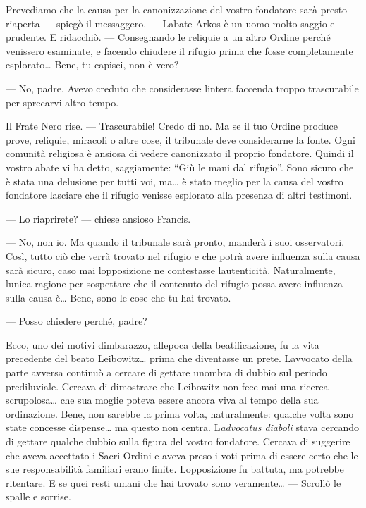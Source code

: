 Prevediamo che la causa per la canonizzazione del vostro fondatore sarà
presto riaperta --- spiegò il messaggero. --- L\textquotesingle abate
Arkos è un uomo molto saggio e prudente. E ridacchiò. --- Consegnando le
reliquie a un altro Ordine perché venissero esaminate, e facendo
chiudere il rifugio prima che fosse completamente esplorato\ldots{}
Bene, tu capisci, non è vero?

--- No, padre. Avevo creduto che considerasse l\textquotesingle intera
faccenda troppo trascurabile per sprecarvi altro tempo.

Il Frate Nero rise. --- Trascurabile! Credo di no. Ma se il tuo Ordine
produce prove, reliquie, miracoli o altre cose, il tribunale deve
considerarne la fonte. Ogni comunità religiosa è ansiosa di vedere
canonizzato il proprio fondatore. Quindi il vostro abate vi ha detto,
saggiamente: ``Giù le mani dal rifugio''. Sono sicuro che è stata una
delusione per tutti voi, ma\ldots{} è stato meglio per la causa del
vostro fondatore lasciare che il rifugio venisse esplorato alla presenza
di altri testimoni.

--- Lo riaprirete? --- chiese ansioso Francis.

--- No, non io. Ma quando il tribunale sarà pronto, manderà i suoi
osservatori. Così, tutto ciò che verrà trovato nel rifugio e che potrà
avere influenza sulla causa sarà sicuro, caso mai
l\textquotesingle opposizione ne contestasse
l\textquotesingle autenticità. Naturalmente, l\textquotesingle unica
ragione per sospettare che il contenuto del rifugio possa avere
influenza sulla causa è\ldots{} Bene, sono le cose che tu hai trovato.

--- Posso chiedere perché, padre?

Ecco, uno dei motivi d\textquotesingle imbarazzo,
all\textquotesingle epoca della beatificazione, fu la vita precedente
del beato Leibowitz\ldots{} prima che diventasse un prete.
L\textquotesingle avvocato della parte avversa continuò a cercare di
gettare un\textquotesingle ombra di dubbio sul periodo prediluviale.
Cercava di dimostrare che Leibowitz non fece mai una ricerca
scrupolosa\ldots{} che sua moglie poteva essere ancora viva al tempo
della sua ordinazione. Bene, non sarebbe la prima volta, naturalmente:
qualche volta sono state concesse dispense\ldots{} ma questo non
c\textquotesingle entra. L\textquotesingle{}\emph{advocatus diaboli}
stava cercando di gettare qualche dubbio sulla figura del vostro
fondatore. Cercava di suggerire che aveva accettato i Sacri Ordini e
aveva preso i voti prima di essere certo che le sue responsabilità
familiari erano finite. L\textquotesingle opposizione fu battuta, ma
potrebbe ritentare. E se quei resti umani che hai trovato sono
veramente\ldots{} --- Scrollò le spalle e sorrise.

